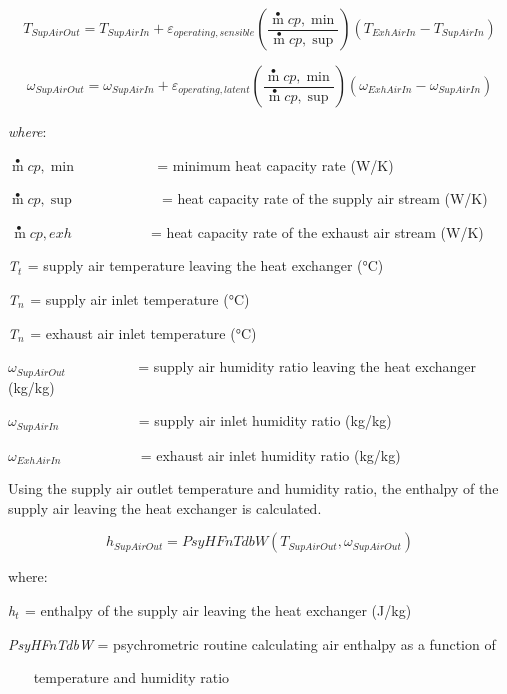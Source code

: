 \begin{equation}
{T_{SupAirOut}} = {T_{SupAirIn}} + {\varepsilon_{operating,sensible}}\left( {\frac{{\mathop m\limits^ \bullet  cp,\min }}{{\mathop m\limits^ \bullet  cp,\sup }}} \right)({T_{ExhAirIn}} - {T_{SupAirIn}})
\end{equation}

\begin{equation}
{\omega_{SupAirOut}} = {\omega_{SupAirIn}} + {\varepsilon_{operating,latent}}\left( {\frac{{\mathop m\limits^ \bullet  cp,\min }}{{\mathop m\limits^ \bullet  cp,\sup }}} \right)({\omega_{ExhAirIn}} - {\omega_{SupAirIn}})
\end{equation}

\emph{where}:

\(\mathop m\limits^ \bullet cp,\min\) ~~~~~~~~~~ = minimum heat capacity rate (W/K)

\(\mathop m\limits^ \bullet cp,\sup\) ~~~~~~~~~~~ = heat capacity rate of the supply air stream (W/K)

\(\mathop {\,m}\limits^ \bullet cp,exh\) ~~~~~~~~~~ = heat capacity rate of the exhaust air stream (W/K)

\emph{T\(_{t}\)}\(_{ }\) = supply air temperature leaving the heat exchanger (°C)

\emph{T\(_{n}\)}\(_{ }\) = supply air inlet temperature (°C)

\emph{T\(_{n}\)}\(_{ }\) = exhaust air inlet temperature (°C)

\({\omega_{SupAirOut}}\) ~~~~~~~~~ = supply air humidity ratio leaving the heat exchanger (kg/kg)

\({\omega_{SupAirIn}}\) ~~~~~~~~~~ = supply air inlet humidity ratio (kg/kg)

\({\omega_{ExhAirIn}}\) ~~~~~~~~~~ = exhaust air inlet humidity ratio (kg/kg)

Using the supply air outlet temperature and humidity ratio, the enthalpy of the supply air leaving the heat exchanger is calculated.

\begin{equation}
{h_{SupAirOut}} = PsyHFnTdbW({T_{SupAirOut}},{\omega_{SupAirOut}})
\end{equation}

where:

\emph{h\(_{t}\)}\(_{ }\) = enthalpy of the supply air leaving the heat exchanger (J/kg)

\emph{PsyHFnTdbW} = psychrometric routine calculating air enthalpy as a function of

~~~ temperature and humidity ratio

